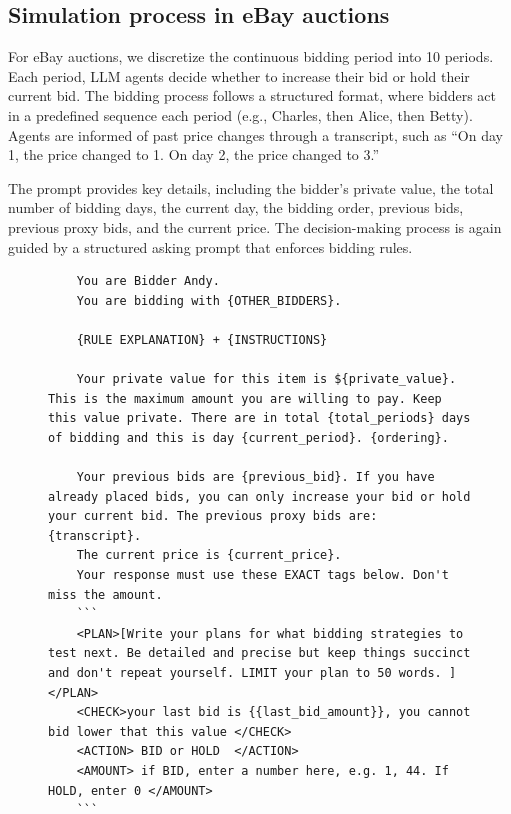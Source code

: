 \documentclass[acmsmall,screen,review]{acmart}
\begin{document}
\subsection{Simulation process in eBay auctions}\label{app:ebay}

For eBay auctions, we discretize the continuous bidding period into 10 periods. Each period, LLM agents decide whether to increase their bid or hold their current bid. The bidding process follows a structured format, where bidders act in a predefined sequence each period (e.g., Charles, then Alice, then Betty). Agents are informed of past price changes through a transcript, such as ``On day 1, the price changed to 1. On day 2, the price changed to 3.''

The prompt provides key details, including the bidder's private value, the total number of bidding days, the current day, the bidding order, previous bids, previous proxy bids, and the current price. The decision-making process is again guided by a structured asking prompt that enforces bidding rules.
\begin{figure}[htbp]
\centering
\begin{minipage}{0.95\textwidth}
\begin{lstlisting}
    You are Bidder Andy.
    You are bidding with {OTHER_BIDDERS}.

    {RULE EXPLANATION} + {INSTRUCTIONS}

    Your private value for this item is ${private_value}. This is the maximum amount you are willing to pay. Keep this value private. There are in total {total_periods} days  of bidding and this is day {current_period}. {ordering}.

    Your previous bids are {previous_bid}. If you have already placed bids, you can only increase your bid or hold your current bid. The previous proxy bids are: {transcript}.
    The current price is {current_price}.
    Your response must use these EXACT tags below. Don't miss the amount.
    ```
    <PLAN>[Write your plans for what bidding strategies to test next. Be detailed and precise but keep things succinct and don't repeat yourself. LIMIT your plan to 50 words. ]</PLAN>
    <CHECK>your last bid is {{last_bid_amount}}, you cannot bid lower that this value </CHECK>
    <ACTION> BID or HOLD  </ACTION>
    <AMOUNT> if BID, enter a number here, e.g. 1, 44. If HOLD, enter 0 </AMOUNT>
    ```
\end{lstlisting}
\end{minipage}
\label{fig:ebay_prompt}
\end{figure}
\end{document}
